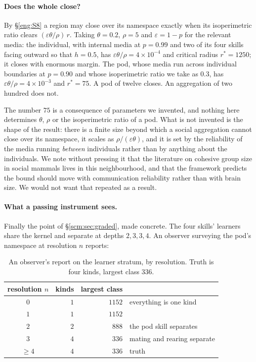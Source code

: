 \paragraph{Does the whole close?}
By \S\ref{eng:S8} a region may close over its namespace exactly when its
isoperimetric ratio clears $(\varepsilon\theta/\rho)\,r$. Taking
$\theta = 0.2$, $\rho = 5$ and $\varepsilon = 1-p$ for the relevant media:
the individual, with internal media at $p = 0.99$ and two of its four
skills facing outward so that $h = 0.5$, has
$\varepsilon\theta/\rho = 4\times 10^{-4}$ and critical radius
$r^\ast = 1250$; it closes with enormous margin. The pod, whose media run
across individual boundaries at $p = 0.90$ and whose isoperimetric ratio
we take as $0.3$, has $\varepsilon\theta/\rho = 4\times 10^{-3}$ and
$r^\ast = 75$. A pod of twelve closes. An aggregation of two hundred does
not.

\begin{remark}
\label{scm:rmk:groupsize}
The number $75$ is a consequence of parameters we invented, and nothing
here determines $\theta$, $\rho$ or the isoperimetric ratio of a pod. What
is not invented is the shape of the result: there is a finite size beyond
which a social aggregation cannot close over its namespace, it scales as
$\rho/(\varepsilon\theta)$, and it is set by the reliability of the media
running \emph{between} individuals rather than by anything about the
individuals. We note without pressing it that the literature on cohesive
group size in social mammals lives in this neighbourhood, and that the
framework predicts the bound should move with communication reliability
rather than with brain size. We would not want that repeated as a result.
\end{remark}

\paragraph{What a passing instrument sees.}
Finally the point of \S\ref{scm:sec:graded}, made concrete. The four
skills' learners share the kernel and separate at depths $2, 3, 3, 4$. An
observer surveying the pod's namespace at resolution $n$ reports:

\begin{table}[h]
\centering
\small
\begin{tabular}{crrl}
\toprule
resolution $n$ & kinds & largest class & \\
\midrule
$0$ & $1$ & $1152$ & everything is one kind \\
$1$ & $1$ & $1152$ & \\
$2$ & $2$ & $888$ & the pod skill separates \\
$3$ & $4$ & $336$ & mating and rearing separate \\
$\ge 4$ & $4$ & $336$ & truth \\
\bottomrule
\end{tabular}
\caption{An observer's report on the learner stratum, by resolution. Truth
is four kinds, largest class $336$.}
\label{scm:tab:observer}
\end{table}

